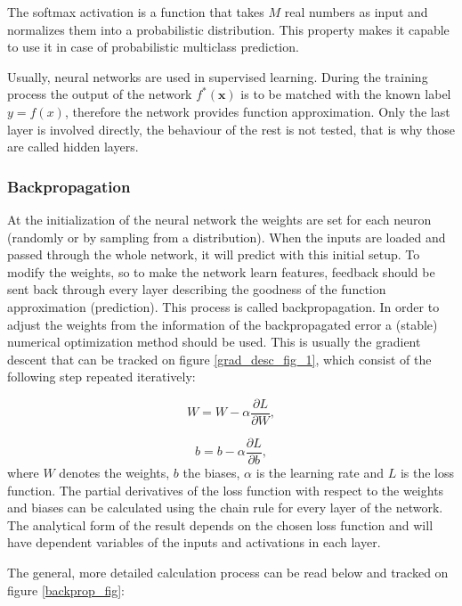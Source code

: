 \documentclass[12pt]{article}
\theoremstyle{plain}
\begin{document}
The softmax activation is a function that takes $M$ real numbers as input and normalizes them into a probabilistic distribution. This property makes it capable to use it in case of probabilistic multiclass prediction.

Usually, neural networks are used in supervised learning. During the training process the output of the network $f^*(\textbf{x})$ is to be matched with the known label $y=f(x)$, therefore the network provides function approximation. Only the last layer is involved directly, the behaviour of the rest is not tested, that is why those are called hidden layers.

\subsubsection{Backpropagation}

At the initialization of the neural network the weights are set for each neuron (randomly or by sampling from a distribution). When the inputs are loaded and passed through the whole network, it will predict with this initial setup. To modify the weights, so to make the network learn features, feedback should be sent back through every layer describing the goodness of the function approximation (prediction). This process is called backpropagation. In order to adjust the weights from the information of the backpropagated error a (stable) numerical optimization method should be used. This is usually the gradient descent that can be tracked on figure \ref{grad_desc_fig_1}, which consist of the following step repeated iteratively:

\begin{equation}
W = W - \alpha \frac{ \partial L}{ \partial W},
\end{equation}

\begin{equation}
b = b - \alpha \frac{ \partial L}{ \partial b},
\end{equation}
where $W$ denotes the weights, $b$ the biases, $\alpha$ is the learning rate and $L$ is the loss function. The partial derivatives of the loss function with respect to the weights and biases can be calculated using the chain rule for every layer of the network. The analytical form of the result depends on the chosen loss function and will have dependent variables of the inputs and activations in each layer. 

The general, more detailed calculation process can be read below and tracked on figure \ref{backprop_fig}:
\end{document}
